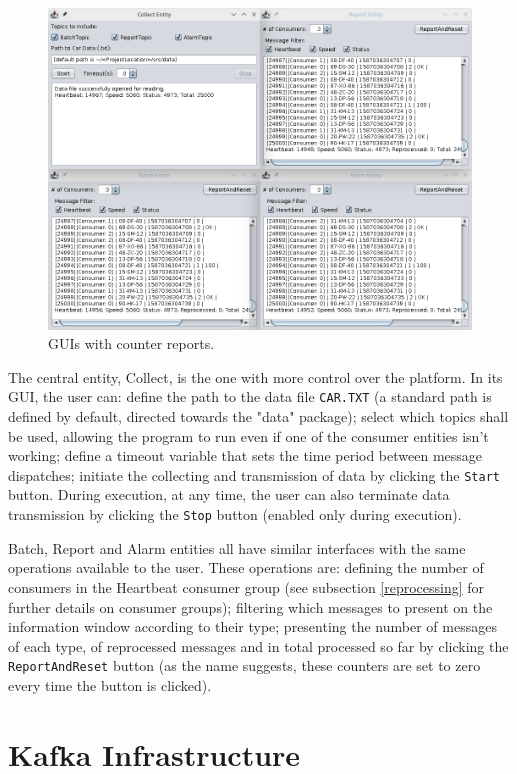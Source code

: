 \documentclass[12pt]{article}
\begin{document}
\begin{figure}[H]
  \centering
  \begin{minipage}{\textwidth}
    \centering
    \includegraphics[width=.85\linewidth]{img/GUI_3.png}
  \end{minipage}%
  \caption{GUIs with counter reports.}
  \label{GUI_3}
\end{figure} 

The central entity, Collect, is the one with more control over the platform.
In its GUI, the user can: 
define the path to the data file \texttt{CAR.TXT} (a standard path is defined by default, directed towards the "data" package);
select which topics shall be used, allowing the program to run even if one of the consumer entities isn't working;
define a timeout variable that sets the time period between message dispatches;
initiate the collecting and transmission of data by clicking the \texttt{Start} button.
During execution, at any time, the user can also terminate data transmission by clicking the \texttt{Stop} button (enabled only during execution).

Batch, Report and Alarm entities all have similar interfaces with the same operations available to the user.
These operations are:
defining the number of consumers in the Heartbeat consumer group (see subsection \ref{reprocessing} for further details on consumer groups);
filtering which messages to present on the information window according to their type;
presenting the number of messages of each type, of reprocessed messages and in total processed so far by clicking the \texttt{ReportAndReset} button 
(as the name suggests, these counters are set to zero every time the button is clicked).

\newpage
\section{Kafka Infrastructure} \label{infrastructure} %
\end{document}
